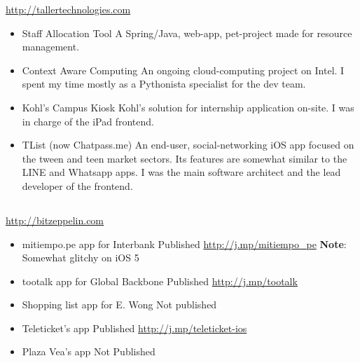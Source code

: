 \documentclass[11pt,a4paper,english]{moderncv}
\begin{document}
{
\url{http://tallertechnologies.com}
\newline{}
\begin{itemize}
    \item Staff Allocation Tool
        \newline{}
        A Spring/Java, web-app, pet-project made for resource management.
    \item Context Aware Computing
        \newline{}
        An ongoing cloud-computing project on Intel. I spent my time mostly as a Pythonista specialist for the dev team.
    \item Kohl's Campus Kiosk
        \newline{}
        Kohl's solution for internship application on-site. I was in charge of the iPad frontend.
    \item TList (now Chatpass.me)
        \newline{}
        An end-user, social-networking iOS app focused on the tween and teen market sectors. Its features are somewhat similar to the LINE and Whatsapp apps. I was the main software architect and the lead developer of the frontend.
\end{itemize}
}

\subsection{}

{
\url{http://bitzeppelin.com}
\newline{}
\begin{itemize}
    \item mitiempo.pe app for Interbank
        \newline{}
        Published \url{http://j.mp/mitiempo_pe}
        \newline{}
        \textbf{Note}: Somewhat glitchy on iOS 5
    \item tootalk app for Global Backbone
        \newline{}
        Published \url{http://j.mp/tootalk}
    \item Shopping list app for E. Wong
        \newline{}
        Not published
    \item Teleticket's app
        \newline{}
        Published \url{http://j.mp/teleticket-ios}
    \item Plaza Vea's app
        \newline{}
        Not Published
\end{itemize}
}
\end{document}
